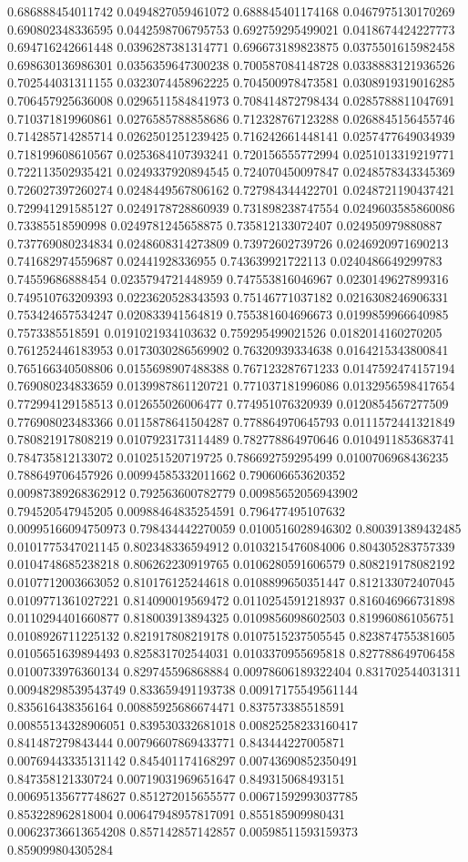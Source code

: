 \begin{table}
\begin{tabu}
\begin{sparkline}{10}
0.686888454011742 0.0494827059461072 0.688845401174168 0.0467975130170269 0.690802348336595 0.0442598706795753 0.692759295499021 0.0418674424227773 0.694716242661448 0.0396287381314771 0.696673189823875 0.0375501615982458 0.698630136986301 0.0356359647300238 0.700587084148728 0.0338883121936526 0.702544031311155 0.0323074458962225 0.704500978473581 0.0308919319016285 0.706457925636008 0.0296511584841973 0.708414872798434 0.0285788811047691 0.710371819960861 0.0276585788858686 0.712328767123288 0.0268845156455746 0.714285714285714 0.0262501251239425 0.716242661448141 0.0257477649034939 0.718199608610567 0.0253684107393241 0.720156555772994 0.0251013319219771 0.722113502935421 0.0249337920894545 0.724070450097847 0.0248578343345369 0.726027397260274 0.0248449567806162 0.727984344422701 0.0248721190437421 0.729941291585127 0.0249178728860939 0.731898238747554 0.0249603585860086 0.73385518590998 0.0249781245658875 0.735812133072407 0.024950979880887 0.737769080234834 0.0248608314273809 0.73972602739726 0.0246920971690213 0.741682974559687 0.02441928336955 0.743639921722113 0.0240486649299783 0.74559686888454 0.0235794721448959 0.747553816046967 0.0230149627899316 0.749510763209393 0.0223620528343593 0.75146771037182 0.0216308246906331 0.753424657534247 0.020833941564819 0.755381604696673 0.0199859966640985 0.7573385518591 0.0191021934103632 0.759295499021526 0.0182014160270205 0.761252446183953 0.0173030286569902 0.76320939334638 0.0164215343800841 0.765166340508806 0.0155698907488388 0.767123287671233 0.0147592474157194 0.769080234833659 0.0139987861120721 0.771037181996086 0.0132956598417654 0.772994129158513 0.012655026006477 0.774951076320939 0.0120854567277509 0.776908023483366 0.0115878641504287 0.778864970645793 0.0111572441321849 0.780821917808219 0.0107923173114489 0.782778864970646 0.0104911853683741 0.784735812133072 0.010251520719725 0.786692759295499 0.0100706968436235 0.788649706457926 0.00994585332011662 0.790606653620352 0.00987389268362912 0.792563600782779 0.00985652056943902 0.794520547945205 0.00988464835254591 0.796477495107632 0.00995166094750973 0.798434442270059 0.0100516028946302 0.800391389432485 0.0101775347021145 0.802348336594912 0.0103215476084006 0.804305283757339 0.0104748685238218 0.806262230919765 0.0106280591606579 0.808219178082192 0.0107712003663052 0.810176125244618 0.0108899650351447 0.812133072407045 0.0109771361027221 0.814090019569472 0.0110254591218937 0.816046966731898 0.0110294401660877 0.818003913894325 0.0109856098602503 0.819960861056751 0.0108926711225132 0.821917808219178 0.0107515237505545 0.823874755381605 0.0105651639894493 0.825831702544031 0.0103370955695818 0.827788649706458 0.0100733976360134 0.829745596868884 0.00978606189322404 0.831702544031311 0.00948298539543749 0.833659491193738 0.00917175549561144 0.835616438356164 0.00885925686674471 0.837573385518591 0.00855134328906051 0.839530332681018 0.00825258233160417 0.841487279843444 0.00796607869433771 0.843444227005871 0.00769443335131142 0.845401174168297 0.00743690852350491 0.847358121330724 0.00719031969651647 0.849315068493151 0.00695135677748627 0.851272015655577 0.00671592993037785 0.853228962818004 0.00647948957817091 0.855185909980431 0.00623736613654208 0.857142857142857 0.00598511593159373 0.859099804305284 
\end{sparkline}
\end{tabu}
\end{table}
